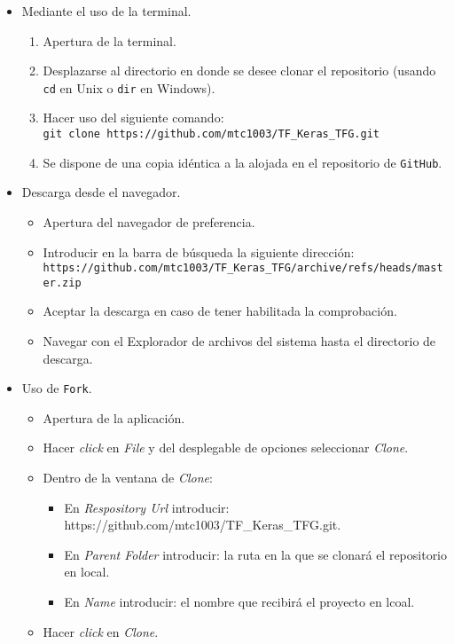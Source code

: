 \begin{itemize} \label{downloadGit}
    \item Mediante el uso de la terminal.
    \begin{enumerate}
    \tightlist
    \item Apertura de la terminal.
    \item Desplazarse al directorio en donde se desee clonar el repositorio (usando \texttt{cd} en Unix o \texttt{dir} en Windows).
    \item Hacer uso del siguiente comando:\\
    \texttt{git clone https://github.com/mtc1003/TF\_Keras\_TFG.git}
    \item Se dispone de una copia idéntica a la alojada en el repositorio de \texttt{GitHub}.
    \end{enumerate}
    
    \item Descarga desde el navegador.
    \begin{itemize}
    \tightlist
    \item Apertura del navegador de preferencia.
    \item Introducir en la barra de búsqueda la siguiente dirección:\\
    \texttt{https://github.com/mtc1003/TF\_Keras\_TFG/archive/refs/heads/master.zip}
    \item Aceptar la descarga en caso de tener habilitada la comprobación.
    \item Navegar con el Explorador de archivos del sistema hasta el directorio de descarga.
    \end{itemize}

    \item Uso de \texttt{Fork}.
    \begin{itemize}
    \tightlist
    \item Apertura de la aplicación.
    \item Hacer \textit{click} en \textit{File} y del desplegable de opciones seleccionar \textit{Clone}.
    \item Dentro de la ventana de \textit{Clone}:
    \begin{itemize}
    \item En \textit{Respository Url} introducir:\\ https://github.com/mtc1003/TF\_Keras\_TFG.git.
    \item En \textit{Parent Folder} introducir: la ruta en la que se clonará el repositorio en local.
    \item En \textit{Name} introducir: el nombre que recibirá el proyecto en lcoal.
    \end{itemize}
    \item Hacer \textit{click} en \textit{Clone}.
    \end{itemize}
\end{itemize}

